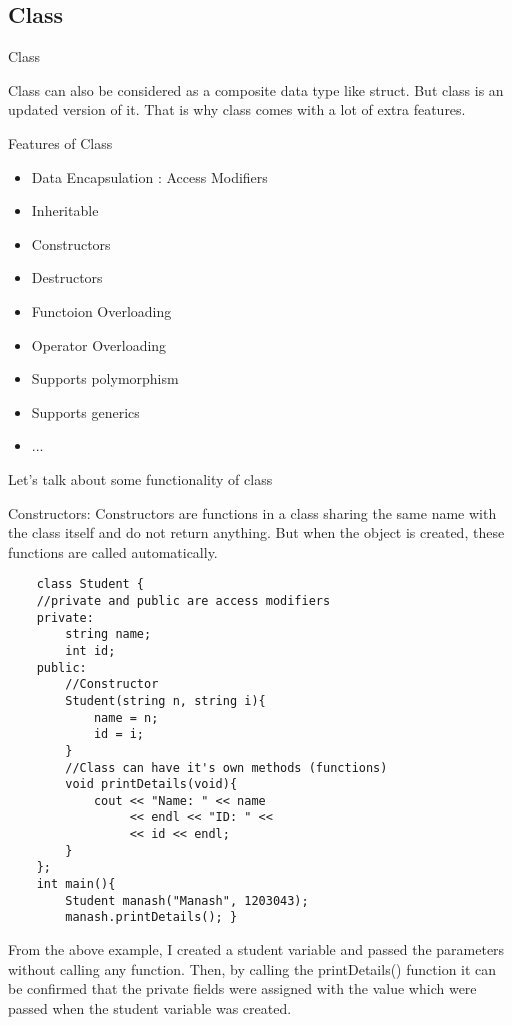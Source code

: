 \documentclass[newPxFont]{beamer}
\begin{document}
\endgroup

\subsection{Class}

\begin{frame}{Class}

\alert{Class} can also be considered as a composite data type like \alert{struct}. But class is an updated version of it. That is why class comes with a lot of extra features.

\begin{exampleblock}{Features of Class}
    \begin{itemize}
        \item{Data Encapsulation : Access Modifiers}
        \item{Inheritable}
        \item{Constructors}
        \item{Destructors}
        \item{Functoion Overloading}
        \item{Operator Overloading}
        \item{Supports polymorphism}
        \item{Supports generics}
        \item{...}
    \end{itemize}
\end{exampleblock}


Let's talk about some functionality of class

\alert{Constructors:}
Constructors are functions in a class sharing the same name with the class itself and do not return anything. But when the object is created, these functions are called automatically. 
\begin{verbatim}
    class Student {
    //private and public are access modifiers
    private:
        string name;
        int id;
    public:
        //Constructor
        Student(string n, string i){
            name = n;
            id = i;
        }
        //Class can have it's own methods (functions)
        void printDetails(void){
            cout << "Name: " << name
                 << endl << "ID: " << 
                 << id << endl;
        }
    };
    int main(){
        Student manash("Manash", 1203043);
        manash.printDetails(); }
\end{verbatim}

From the above example, I created a student variable and passed the parameters without calling any function. Then, by calling the \alert{printDetails()} function it can be confirmed that the private fields were assigned with the value which were passed when the student variable was created.


\end{frame}
\end{document}
